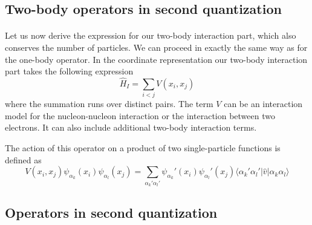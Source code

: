 \documentclass[%
twoside,                 %
final,                   %
10pt]{article}
\begin{document}
\subsection*{Two-body operators in second quantization}

\paragraph{}
Let us now derive the expression for our two-body interaction part, which also conserves the number of particles.
We can proceed in exactly the same way as for the one-body operator. In the coordinate representation our
two-body interaction part takes the following expression
\begin{equation}
	\hat{H}_I = \sum_{i < j} V(x_i,x_j) \label{eq:2-31}
\end{equation}
where the summation runs over distinct pairs. The term $V$ can be an interaction model for the nucleon-nucleon interaction
or the interaction between two electrons. It can also include additional two-body interaction terms. 

The action of this operator on a product of 
two single-particle functions is defined as 
\begin{equation}
	V(x_i,x_j) \psi_{\alpha_k}(x_i) \psi_{\alpha_l}(x_j) = \sum_{\alpha_k'\alpha_l'} 
		\psi_{\alpha_k}'(x_i)\psi_{\alpha_l}'(x_j) 
		\langle \alpha_k'\alpha_l'|\hat{v}|\alpha_k\alpha_l\rangle \label{eq:2-32}
\end{equation}






\subsection*{Operators in second quantization}

\end{document}
